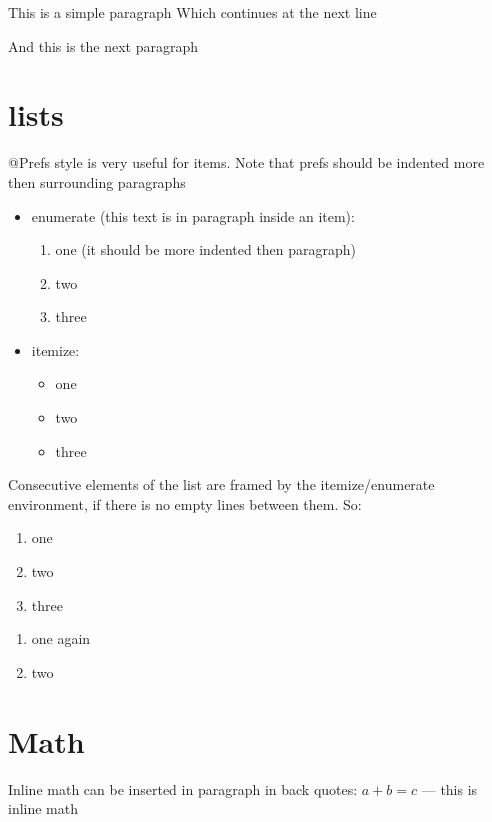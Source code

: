 \documentclass[12pt,a4paper,oneside]{article}
\begin{document}

This is a simple paragraph
Which continues at the next line

And this is the next paragraph

\section{lists} 
@Prefs style is very useful for items. 
Note that prefs should be indented more then surrounding paragraphs
\begin{itemize}
\item enumerate (this text is in paragraph inside an item):
\begin{enumerate}
\item one (it should be more indented then paragraph)
\item two
\item three
\end{enumerate}
\item itemize:
\begin{itemize}
\item one
\item two
\item three
\end{itemize}
\end{itemize}

Consecutive elements of the list are framed by the itemize/enumerate environment,
if there is no empty lines between them. So:
\begin{enumerate}
\item one
\item two
\item three
\end{enumerate}

\begin{enumerate}
\item one again
\item two
\end{enumerate}

\section{Math}
Inline math can be inserted in paragraph in back quotes: $a + b = c$ 
--- this is inline math
\end{document}
